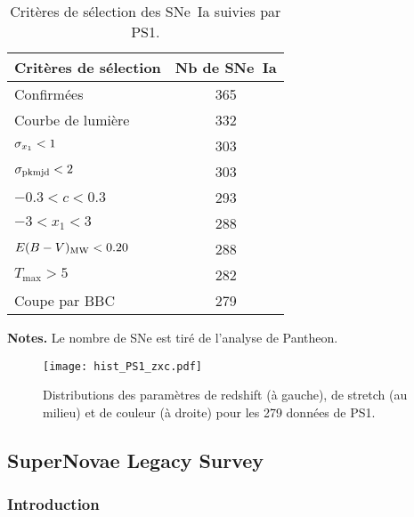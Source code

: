 \documentclass[../main/main.tex]{subfiles}
\begin{document}
\begin{table}[]
    \centering
    \begin{threeparttable}
        \caption{Critères de sélection des SNe~Ia suivies par PS1.}
        \label{tab:ps1cuts}
        \begin{tabular}{lc}
            \toprule
            Critères de sélection     & Nb de SNe~Ia \\
            \midrule
            Confirmées                & 365 \\
            Courbe de lumière         & 332 \\
            $\sigma_{x_1} < 1$            & 303 \\
            $\sigma_{\rm pkmjd} < 2$      & 303 \\
            $-0.3 < c < 0.3$          & 293 \\
            $-3 < x_1 < 3$            & 288 \\
            $E(B-V)_{\rm MW} < 0.20 $ & 288 \\
            $T_{\max} > 5$            & 282 \\
            \midrule
            Coupe par BBC             & 279 \\
            \bottomrule
        \end{tabular}
        \begin{tablenotes}[flushleft]
        \item \textbf{\hspace{-3.2pt}Notes.} Le nombre de SNe est tiré de
            l'analyse de Pantheon.
        \end{tablenotes}
    \end{threeparttable}
\end{table}

\begin{figure}[h]
    \centering
    \texttt{[image: hist\_PS1\_zxc.pdf]}
    \captionsetup{justification=centering}
    \caption{Distributions des paramètres de redshift (à gauche), de stretch (au
    milieu) et de couleur (à droite) pour les 279 données de PS1.}
    \label{fig:ps1hist}
\end{figure}

\subsection{SuperNovae Legacy Survey}\label{ssec:snls}
\subsubsection{Introduction}\label{sssec:snlsintro}
\end{document}
